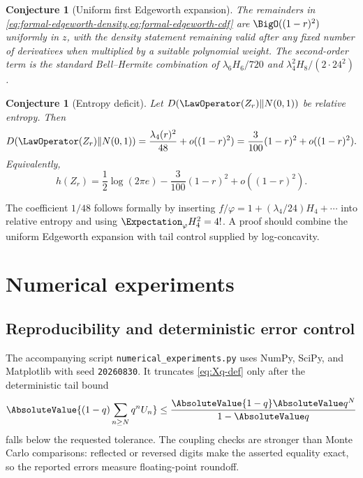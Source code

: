 \documentclass[11pt]{article}
\newtheorem{conjecture}[theorem]{Conjecture}
\theoremstyle{definition}
\newcommand{\phiN}{\varphi}
\begin{document}
\begin{conjecture}[Uniform first Edgeworth expansion]\label{conj:edgeworth}
The remainders in \cref{eq:formal-edgeworth-density,eq:formal-edgeworth-cdf} are
\(\BigO((1-r)^2)\) uniformly in \(z\), with the density statement remaining valid after
any fixed number of derivatives when multiplied by a suitable polynomial weight.
The second-order term is the standard Bell--Hermite combination of
\(\lambda_6H_6/720\) and \(\lambda_4^2H_8/(2\cdot24^2)\).
\end{conjecture}

\begin{conjecture}[Entropy deficit]\label{conj:entropy-deficit}
Let \(D(\LawOperator(Z_r)\Vert N(0,1))\) be relative entropy.  Then
\begin{equation}
 D(\LawOperator(Z_r)\Vert N(0,1))
 =\frac{\lambda_4(r)^2}{48}+o((1-r)^2)
 =\frac{3}{100}(1-r)^2+o((1-r)^2).                        \label{eq:entropy-deficit}
\end{equation}
Equivalently,
\[
 h(Z_r)=\frac12\log(2\pi e)-\frac{3}{100}(1-r)^2+o((1-r)^2).
\]
\end{conjecture}

The coefficient \(1/48\) follows formally by inserting
\(f/\phiN=1+(\lambda_4/24)H_4+\cdots\) into relative entropy and using
\(\Expectation_{\phiN}H_4^2=4!\).  A proof should combine the uniform Edgeworth expansion with
tail control supplied by log-concavity.

\section{Numerical experiments}

\subsection{Reproducibility and deterministic error control}

The accompanying script \texttt{numerical\_experiments.py} uses NumPy, SciPy, and
Matplotlib with seed \texttt{20260830}.  It truncates \cref{eq:Xq-def} only after the
deterministic tail bound
\begin{equation}
 \AbsoluteValue{(1-q)\sum_{n\ge N}q^nU_n}
 \le\frac{\AbsoluteValue{1-q}\AbsoluteValue q^N}{1-\AbsoluteValue q}                  \label{eq:numerical-tail}
\end{equation}
falls below the requested tolerance.  The coupling checks are stronger than Monte Carlo
comparisons: reflected or reversed digits make the asserted equality exact, so the
reported errors measure floating-point roundoff.
\end{document}
